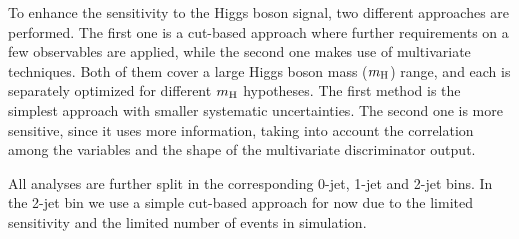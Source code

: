 To enhance the sensitivity to the Higgs boson signal, two different
approaches are performed. The first one is a cut-based approach where
further requirements on a few observables are applied, while the
second one makes use of multivariate techniques. Both of them cover a
large Higgs boson mass ($m_{\rm{H}}$) range, and each is separately
optimized for different $m_{\rm{H}}$ hypotheses. The first method is
the simplest approach with smaller systematic uncertainties. The
second one is more sensitive, since it uses more information, taking
into account the correlation among the variables and the shape of the
multivariate discriminator output.

All analyses are further split in the corresponding 0-jet, 1-jet and
2-jet bins. In the 2-jet bin we use a simple cut-based approach for
now due to the limited sensitivity and the limited number of events in
simulation.
